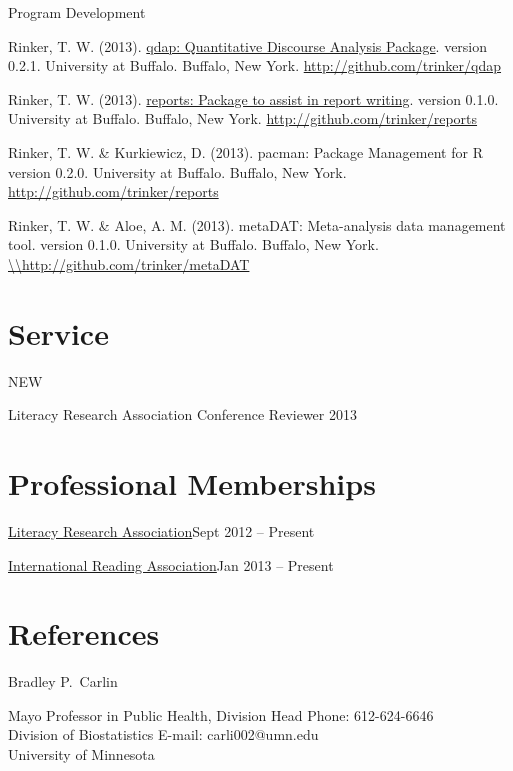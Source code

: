 \halfblankline

Program Development
\begin{innerlist}
    \item Rinker, T. W. (2013). \href{http://cran.r-project.org/web/packages/qdap/index.html}{qdap: Quantitative Discourse Analysis Package}. version 0.2.1. University at Buffalo. Buffalo, New York. \url{http://github.com/trinker/qdap}
    \item Rinker, T. W. (2013). \href{http://cran.r-project.org/web/packages/reports/index.html}{reports: Package to assist in report writing}. version 0.1.0. University at Buffalo. Buffalo, New York. \url{http://github.com/trinker/reports}
    \item Rinker, T. W. \& Kurkiewicz, D. (2013). pacman: Package Management for R version 0.2.0. University at Buffalo. Buffalo, New York. \url{http://github.com/trinker/reports}
    \item Rinker, T. W. \& Aloe, A. M. (2013). metaDAT: Meta-analysis data management tool. version 0.1.0. University at Buffalo. Buffalo, New York. \url{\\http://github.com/trinker/metaDAT}
\end{innerlist}

\section{Service}
NEW
\begin{innerlist}
    \item Literacy Research Association Conference Reviewer \hfill {2013}
\end{innerlist}



\section{Professional Memberships}
\begin{innerlist}
    \item \href{http://www.literacyresearchassociation.org/}{Literacy Research Association}\hfill {Sept 2012 -- Present}
    \item \href{http://www.reading.org/}{International Reading Association}\hfill {Jan 2013 -- Present}
\end{innerlist}


\section{References}
Bradley P.\ Carlin
\begin{innerlist}
\item[] Mayo Professor in Public Health, Division Head \hfill {Phone: 612-624-6646}\\
Division of Biostatistics \hfill{E-mail: carli002@umn.edu}\\
University of Minnesota
\end{innerlist}

\halfblankline


\halfblankline




